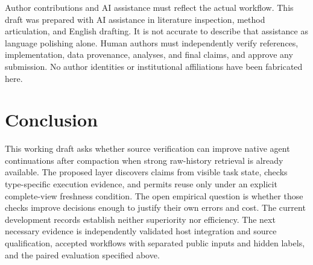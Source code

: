 Author contributions and AI assistance must reflect the actual workflow.
This draft was prepared with AI assistance in literature inspection,
method articulation, and English drafting. It is not accurate to
describe that assistance as language polishing alone. Human authors must
independently verify references, implementation, data provenance,
analyses, and final claims, and approve any submission. No author
identities or institutional affiliations have been fabricated here.

\section{Conclusion}\label{conclusion}

This working draft asks whether source verification can improve native
agent continuations after compaction when strong raw-history retrieval
is already available. The proposed layer discovers claims from visible
task state, checks type-specific execution evidence, and permits reuse
only under an explicit complete-view freshness condition. The open
empirical question is whether those checks improve decisions enough to
justify their own errors and cost. The current development records
establish neither superiority nor efficiency. The next necessary
evidence is independently validated host integration and source
qualification, accepted workflows with separated public inputs and
hidden labels, and the paired evaluation specified above.
